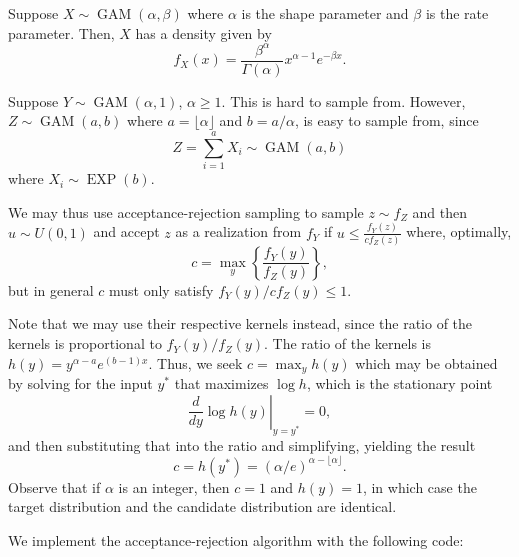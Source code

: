 \documentclass[
  11pt,
]{paper}
\begin{document}
Suppose \(X \sim \operatorname{GAM}(\alpha,\beta)\) where \(\alpha\) is
the shape parameter and \(\beta\) is the rate parameter. Then, \(X\) has
a density given by \[
  f_X(x) = \frac{\beta^\alpha}{\Gamma(\alpha)} x^{\alpha-1} e^{-\beta x}.
\]

Suppose \(Y \sim \operatorname{GAM}(\alpha,1)\), \(\alpha \geq 1\). This
is hard to sample from. However, \(Z \sim \operatorname{GAM}(a,b)\)
where \(a = \lfloor \alpha \rfloor\) and \(b = a / \alpha\), is easy to
sample from, since \[
  Z = \sum_{i=1}^{a} X_i \sim \operatorname{GAM}(a,b)
\] where \(X_i \sim \operatorname{EXP}(b)\).

We may thus use acceptance-rejection sampling to sample \(z \sim f_Z\)
and then \(u \sim U(0,1)\) and accept \(z\) as a realization from
\(f_Y\) if \(u \leq \frac{f_Y(z)}{c f_Z(z)}\) where, optimally, \[
  c = \max_y \left\{\frac{f_Y(y)}{f_Z(y)}\right\},
\] but in general \(c\) must only satisfy \(f_Y(y) / c f_Z(y) \leq 1\).

Note that we may use their respective kernels instead, since the ratio
of the kernels is proportional to \(f_Y(y)/f_Z(y)\). The ratio of the
kernels is \(h(y) = y^{\alpha-a} e^{(b-1)x}\). Thus, we seek
\(c = \max_y h(y)\) which may be obtained by solving for the input
\(y^*\) that maximizes \(\log h\), which is the stationary point \[
  \left. \frac{d}{dy}\log h(y) \right\vert_{y = y^*} = 0,
\] and then substituting that into the ratio and simplifying, yielding
the result \[
  c = h(y^*) = (\alpha/e)^{\alpha-\lfloor \alpha \rfloor}.
\] Observe that if \(\alpha\) is an integer, then \(c = 1\) and
\(h(y) = 1\), in which case the target distribution and the candidate
distribution are identical.

We implement the acceptance-rejection algorithm with the following code:
\end{document}
